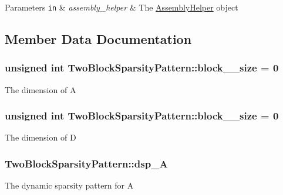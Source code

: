\begin{DoxyParams}[1]{Parameters}
\mbox{\tt in}  & {\em assembly\+\_\+helper} & The \hyperlink{class_assembly_helper}{Assembly\+Helper} object \\
\hline
\end{DoxyParams}


\subsection{Member Data Documentation}
\subsubsection[{\texorpdfstring{block\+\_\+0\+\_\+size}{block_0_size}}]{\setlength{\rightskip}{0pt plus 5cm}unsigned int Two\+Block\+Sparsity\+Pattern\+::block\+\_\+\_\+size = 0\hspace{0.3cm}{\ttfamily [private]}}\hypertarget{class_two_block_sparsity_pattern_a81789900ac1a9f5bfd7f85ad730eb03b}{}\label{class_two_block_sparsity_pattern_a81789900ac1a9f5bfd7f85ad730eb03b}
The dimension of A 
\subsubsection[{\texorpdfstring{block\+\_\+1\+\_\+size}{block_1_size}}]{\setlength{\rightskip}{0pt plus 5cm}unsigned int Two\+Block\+Sparsity\+Pattern\+::block\+\_\+\_\+size = 0\hspace{0.3cm}{\ttfamily [private]}}\hypertarget{class_two_block_sparsity_pattern_ab215e3553e07b5f5872b1e01228968f2}{}\label{class_two_block_sparsity_pattern_ab215e3553e07b5f5872b1e01228968f2}
The dimension of D 
\subsubsection[{\texorpdfstring{dsp\+\_\+A}{dsp_A}}]{ Two\+Block\+Sparsity\+Pattern\+::dsp\+\_\+A\hspace{0.3cm}{\ttfamily [private]}}\hypertarget{class_two_block_sparsity_pattern_ac3bafc713fec0ec2232fc084f880c50c}{}\label{class_two_block_sparsity_pattern_ac3bafc713fec0ec2232fc084f880c50c}
The dynamic sparsity pattern for A 
